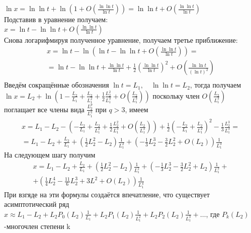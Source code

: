 \documentclass{report}
\begin{document}
$\ln{x}=\ln\ln{t}+\ln\left(1+O(\frac{\ln\ln{t}}{\ln{t}})\right)=\ln\ln{t}+O\left(\frac{\ln\ln{t}}{\ln{t}}\right)$ \\
Подставив в уравнение получаем: \\
$x=\ln{t}-\ln\ln{t}+O\left(\frac{\ln\ln{t}}{\ln{t}}\right)$ \\
Снова логарифмируя полученное уравнение, получаем третье приближение: \\
\begin{multline}
x=\ln{t}-\ln\left(\ln{t}-\ln\ln{t}+O\left(\frac{\ln\ln{t}}{\ln{t}}\right)\right) = \\ 
= \ln{t}-\ln\ln{t}+\frac{\ln\ln{t}}{\ln{t}}+\frac{1}{2}\left(\frac{\ln\ln{t}}{\ln{t}}\right)^{2}+O\left(\frac{\ln\ln{t}}{(\ln{t})^{2}}\right) \\
\end{multline}
Введём сокращённые обозначения $\ln{t}=L_1,\quad\ln\ln{t}=L_2$, тогда получаем \\
$\ln{x}=L_2+\ln\left(1-\frac{L_2}{L_1}+\frac{L_2}{L_1^{2}}+\frac{1}{2}\frac{L_2^{2}}{L_1^{3}}+O\left(\frac{L_2}{L_1^{3}}\right)\right)$
поскольку член $O\left(\frac{L_2}{L_1^{3}}\right)$ поглащает все члены вида $\frac{L_2^{p}}{L_1^{q}}$ при $q>3$, имеем \\
\begin{multline}
    x=L_1-L_2-\left(-\frac{L_2}{L_1}+\frac{L_2}{L_1^{2}}+\frac{1}{2}\frac{L_2^{2}}{L_1^{3}}+O\left(\frac{L_2}{L_1^{3}}\right)\right)
    +\frac{1}{2}\left(-\frac{L_2}{L_1}+\frac{L_2}{L_1^{2}}\right)^{2}-\frac{1}{3}\frac{L_2^{3}}{L_1^{3}} = \\
    = L_1-L_2+\frac{L_2}{L_1}+\left(\frac{1}{2}L_2^{2}-L_2\right)\frac{1}{L_1^{2}}+\left(-\frac{1}{3}L_2^{3}-\frac{3}{2}L_2^{2}+O(L_2)\right)\frac{1}{L_1^{3}}
\end{multline}
На следующем шагу получим \\
\begin{multline}
x=L_1-L_2+\frac{L_2}{L_1}+\left(\frac{1}{2}L_2^{2}-L_2\right)\frac{1}{L_1^{2}}+\left(-\frac{1}{3}L_2^{3}-\frac{3}{2}L_2^{2}+L_2\right)\frac{1}{L_1^{3}}+\\
+\left(\frac{1}{4}L_2^{4}-\frac{11}{6}L_2^{3}+3L^{2}+O(L_2)\right)\frac{1}{L_1^{4}}
\end{multline}
При взгяде на эти формулы создаётся впечатление, что существует асимптотический ряд \\
$x\approx L_1-L_2+L_2P_0(L_2)\frac{1}{L_1}+L_2P_1(L_2)\frac{1}{L_1^{2}}+L_2P_2(L_2)\frac{1}{L_1^{3}}+\dots$, где $P_k(L_2)$-многочлен степени k \\
\end{document}
